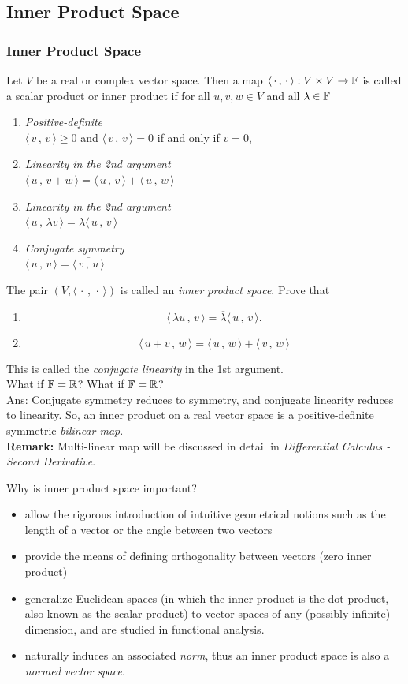 \documentclass[12pt, t]{beamer}
\renewcommand{\emph}[1]{{\color{Turquoise3}\textsl{#1}}}
\newcommand{\nullspace}{~\\[15pt]}
\newcommand{\remark}{\textbf{Remark: }}
\newcommand{\scp}[2]{\langle\,#1\,,\,#2\,\rangle} \newcommand{\scpp}{\langle\,\cdot\,,\,\cdot\,\rangle}
\begin{document}
\subsection{Inner Product Space}
\begin{frame}[allowframebreaks]
    \frametitle{Inner Product Space}
    Let $V$ be a real or complex vector space. Then a map $\langle\,\cdot\,,\,\cdot\,\rangle: V\times V\rightarrow\mathbb{F}$ is called a scalar product or inner product if for all $u,v,w\in V$ and all $\lambda\in\mathbb{F}$
    \begin{enumerate}
        \item \textit{Positive-definite}\\ $\scp{v}{v}\geq0$ and $\scp{v}{v}=0$ if and only if $v=0$,
        \item \textit{Linearity in the 2nd argument}\\ $\scp{u}{v+w}=\scp{u}{v}+\scp{u}{w}$
        \item \textit{Linearity in the 2nd argument}\\ $\scp{u}{\lambda v}=\lambda\scp{u}{v}$
        \item \textit{Conjugate symmetry}\\ $\scp{u}{v}=\overline{\scp{v}{u}}$
    \end{enumerate}
    The pair $(V,\scpp)$ is called an \emph{inner product space}.
    \newpage
    Prove that
    \begin{enumerate}
        \item \[\scp{\lambda u}{v}=\overline{\lambda}\scp{u}{v}.\]
        \item \[\scp{u+v}{w}=\scp{u}{w}+\scp{v}{w}\]
    \end{enumerate}
    This is called the \emph{conjugate linearity} in the 1st argument.
    \nullspace
    What if $\mathbb{F}=\mathbb{R}$?
    \newpage
    What if $\mathbb{F}=\mathbb{R}$?
    \nullspace
    Ans: Conjugate symmetry reduces to symmetry, and conjugate linearity reduces to linearity. So, an inner product on a real vector space is a positive-definite symmetric \emph{bilinear map}.
    \nullspace
    \remark  Multi-linear map will be discussed in detail in \textsl{Differential Calculus - Second Derivative}.

    \newpage
    Why is inner product space important?
    \nullspace
    \begin{itemize}
        \item allow the rigorous introduction of intuitive geometrical notions such as the length of a vector or the angle between two vectors
        \item provide the means of defining orthogonality between vectors (zero inner product)
        \item generalize Euclidean spaces (in which the inner product is the dot product, also known as the scalar product) to vector spaces of any (possibly infinite) dimension, and are studied in functional analysis.
        \item  naturally induces an associated \emph{norm}, thus an inner product space is also a \emph{normed vector space}.
    \end{itemize}
\end{frame}
\end{document}
